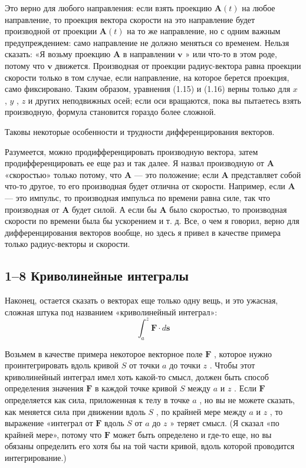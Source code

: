 \documentclass[11pt,oneside]{article}
\providecommand{\FLPA}{\mathbf{A}}
\providecommand{\FLPF}{\mathbf{F}}
\providecommand{\FLPs}{\mathbf{s}}
\providecommand{\FLPv}{\mathbf{v}}
\begin{document}
Это верно для любого направления: если взять проекцию \(\FLPA(t)\) на любое направление, то проекция вектора скорости на это направление будет производной от проекции \(\FLPA(t)\) на то же направление, но с одним важным предупреждением: само направление не должно меняться со временем. Нельзя сказать: «Я возьму проекцию \(\FLPA\) в направлении \(\FLPv\) » или что-то в этом роде, потому что \(\FLPv\) движется. Производная от проекции радиус-вектора равна проекции скорости только в том случае, если направление, на которое берется проекция, само фиксировано. Таким образом, уравнения (1.15) и (1.16) верны только для \(x\) , \(y\) , \(z\) и других неподвижных осей; если оси вращаются, пока вы пытаетесь взять производную, формула становится гораздо более сложной.\par

Таковы некоторые особенности и трудности дифференцирования векторов.\par

Разумеется, можно продифференцировать производную вектора, затем продифференцировать ее еще раз и так далее. Я назвал производную от \(\FLPA\) «скоростью» только потому, что \(\FLPA\) --- это положение; если \(\FLPA\) представляет собой что-то другое, то его производная будет отлична от скорости. Например, если \(\FLPA\) --- это импульс, то производная импульса по времени равна силе, так что производная от \(\FLPA\) будет силой. А если бы \(\FLPA\) было скоростью, то производная скорости по времени была бы ускорением и т. д. Все, о чем я говорил, верно для дифференцирования векторов вообще, но здесь я привел в качестве примера только радиус-векторы и скорости.\par

\subsection*{1--8 Криволинейные интегралы}

Наконец, остается сказать о векторах еще только одну вещь, и это ужасная, сложная штука под названием «криволинейный интеграл»: 
\begin{equation*} \tag{1.17}
\label{Eq:TIPS:1:17} \int_a^z \FLPF\cdot d\FLPs \end{equation*}
\par

Возьмем в качестве примера некоторое векторное поле \(\FLPF\) , которое нужно проинтегрировать вдоль кривой \(S\) от точки \(a\) до точки \(z\) . Чтобы этот криволинейный интеграл имел хоть какой-то смысл, должен быть способ определения значения \(\FLPF\) в каждой точке кривой \(S\) между \(a\) и \(z\) . Если \(\FLPF\) определяется как сила, приложенная к телу в точке \(a\) , но вы не можете сказать, как меняется сила при движении вдоль \(S\) , по крайней мере между \(a\) и \(z\) , то выражение «интеграл от \(\FLPF\) вдоль \(S\) от \(a\) до \(z\) » теряет смысл. (Я сказал «по крайней мере», потому что \(\FLPF\) может быть определено и где-то еще, но вы обязаны определить его хотя бы на той части кривой, вдоль которой проводится интегрирование.)\par
\end{document}
